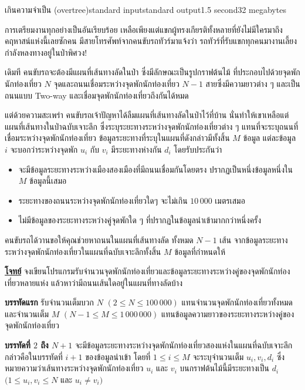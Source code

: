 \documentclass[11pt,a4paper]{article}
\begin{document}
\begin{problem}{เกินความจำเป็น (overtree)}{standard input}{standard output}{1.5 second}{32 megabytes}

      การเตรียมงานทุกอย่างเป็นอันเรียบร้อย เหลือเพียงแต่แขกผู้ทรงเกียรติทั้งหลายที่ยังไม่มีใครมาถึงคฤหาสน์แห่งนี้เลยซักคน มีสายโทรศัพท์จากคนขับรถทัวร์มาแจ้งว่า รถทัวร์ที่รับแขกทุกคนมางานเลี้ยงกำลังหลงทางอยู่ในป่าพิศวง!

      เดิมที คนขับรถจะต้องมีแผนที่เส้นทางลัดในป่า ซึ่งมีลักษณะเป็นรูปกราฟต้นไม้ ที่ประกอบไปด้วยจุดพักนักท่องเที่ยว $N$ จุดและถนนเชื่อมระหว่างจุดพักนักท่องเที่ยว $N-1$ สายซึ่งมีความยาวต่าง ๆ และเป็นถนนแบบ Two-way และเชื่อมจุดพักนักท่องเที่ยวถึงกันได้หมด

      แต่ด้วยความสะเพร่า คนขับรถเจ้าปัญหาได้ลืมแผนที่เส้นทางลัดในป่าไว้ที่บ้าน นั่นทำให้เขาเหลือแต่แผนที่เส้นทางในป่าฉบับเจาะลึก ซึ่งระบุระยะทางระหว่างจุดพักนักท่องเที่ยวต่าง ๆ แทนที่จะระบุถนนที่เชื่อมระหว่างจุดพักนักท่องเที่ยว   ข้อมูลระยะทางที่ระบุในแผนที่ดังกล่าวมีทั้งสิ้น $M$ ข้อมูล แต่ละข้อมูล $i$ จะบอกว่าระหว่างจุดพัก $u_i$ กับ $v_i$ มีระยะทางห่างกัน $d_i$ โดยรับประกันว่า
\begin{itemize}

\item จะมีข้อมูลระยะทางระหว่างเมืองสองเมืองที่มีถนนเชื่อมกันโดยตรง ปรากฏเป็นหนึ่งข้อมูลหนึ่งใน $M$ ข้อมูลนี้เสมอ
\item ระยะทางของถนนระหว่างจุดพักนักท่องเที่ยวใดๆ จะไม่เกิน $10\,000$ เมตรเสมอ
\item ไม่มีข้อมูลของระยะทางระหว่างคู่จุดพักใด ๆ ที่ปรากฏในข้อมูลนำเข้ามากกว่าหนึ่งครั้ง
\end{itemize}      

คนขับรถได้วานขอให้คุณช่วยหาถนนในแผนที่เส้นทางลัด ทั้งหมด $N-1$ เส้น จากข้อมูลระยะทางระหว่างจุดพักนักท่องเที่ยวในแผนที่ฉบับเจาะลึกทั้งสิ้น $M$ ข้อมูลที่กำหนดให้

\bigskip
\underline{\textbf{โจทย์}}  จงเขียนโปรแกรมรับจำนวนจุดพักนักท่องเที่ยวและข้อมูลระยะทางระหว่างคู่ของจุดพักนักท่องเที่ยวหลายแห่ง แล้วหาว่ามีถนนเส้นใดอยู่ในแผนที่ทางลัดบ้าง


\InputFile

\textbf{บรรทัดแรก} รับจำนวนเต็มบวก $N$ $(2 \leq N \leq 100\,000)$ แทนจำนวนจุดพักนักท่องเที่ยวทั้งหมดและจำนวนเต็ม $M$ $(N-1 \leq M \leq 1\,000\,000)$ แทนข้อมูลความยาวของระยะทางระหว่างคู่ของจุดพักนักท่องเที่ยว

\textbf{บรรทัดที่ $2$ ถึง $N+1$} จะมีข้อมูลระยะทางระหว่างจุดพักนักท่องเที่ยวสองแห่งในแผนที่ฉบับเจาะลึก  กล่าวคือในบรรทัดที่ $i+1$ ของข้อมูลนำเข้า โดยที่ $1 \leq i \leq M$ จะระบุจำนวนเต็ม $u_i,v_i,d_i$ ซึ่งหมายความว่าเส้นทางระหว่างจุดพักนักท่องเที่ยว $u_i$ และ $v_i$  บนกราฟต้นไม้นี้มีระยะทางเป็น $d_i$ $(1 \leq u_i,v_i \leq N$ และ $u_i \neq v_i)$


\end{problem}
\end{document}
